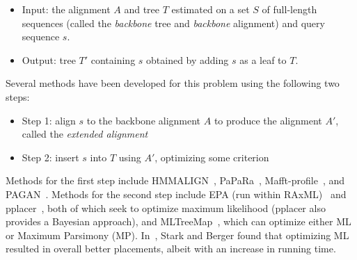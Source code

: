 

\begin{itemize}
\item Input: the alignment $A$ and tree $T$ estimated on a set $S$ of full-length sequences (called the {\em backbone} tree and {\em backbone} alignment) and query sequence $s$.
\item Output: tree $T'$ containing $s$ obtained by adding $s$ as a leaf to
$T$.
\end{itemize}

Several methods have been developed for this problem using
the following two steps:

\begin{itemize}
\item Step 1: align $s$ to the backbone alignment $A$ to produce the alignment $A'$, called the {\em extended alignment}
\item Step 2: insert $s$ into $T$ using $A'$, optimizing some criterion
\end{itemize}
Methods for the first step 
include HMMALIGN~\cite{Eddy1998}, PaPaRa~\cite{Berger2011a}, Mafft-profile~\cite{Katoh2012}, and PAGAN~\cite{Loytynoja2012}.  
Methods for the second step include EPA (run within RAxML)~\cite{Berger2011} and pplacer~\cite{Matsen2010}, both of which
seek to optimize maximum likelihood
(pplacer also provides a Bayesian approach), and MLTreeMap~\cite{Stark2010}, which can optimize either ML or Maximum Parsimony (MP).  In~\cite{Stark2010}, Stark and Berger found that optimizing ML resulted in overall better placements, albeit with an increase in running time.

